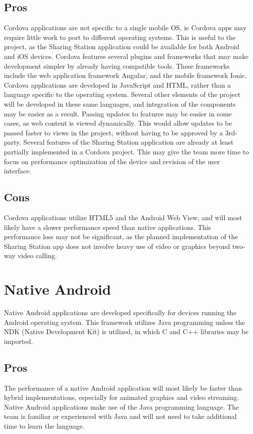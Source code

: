 \documentclass[letterpaper,10pt,draftclsnofoot,onecolumn]{IEEEtran}
\begin{document}
\subsection*{Pros}
Cordova applications are not specific to a single mobile OS, ie Cordova apps may require little work to port to different operating systems. This is useful to the project, as the Sharing Station application could be available for both Android and iOS devices.
Cordova features several plugins and frameworks that may make development simpler by already having compatible tools. These frameworks include the web application framework Angular, and the mobile framework Ionic.
Cordova applications are developed in JavaScript and HTML, rather than a language specific to the operating system. Several other elements of the project will be developed in these same languages, and integration of the components may be easier as a result.
Passing updates to features may be easier in some cases, as web content is viewed dynamically. This would allow updates to be passed faster to views in the project, without having to be approved by a 3rd-party.
Several features of the Sharing Station application are already at least partially implemented in a Cordova project. This may give the team more time to focus on performance optimization of the device and revision of the user interface.
\subsection*{Cons}
Cordova applications utilize HTML5 and the Android Web View, and will most likely have a slower performance speed than native applications. This performance loss may not be significant, as the planned implementation of the Sharing Station app does not involve heavy use of video or graphics beyond two-way video calling.
\section*{Native Android}
Native Android applications are developed specifically for devices running the Android operating system. This framework utilizes Java programming unless the NDK (Native Development Kit) is utilized, in which C and C++ libraries may be imported.
\subsection*{Pros}
The performance of a native Android application will most likely be faster than hybrid implementations, especially for animated graphics and video streaming.
Native Android applications make use of the Java programming language. The team is familiar or experienced with Java and will not need to take additional time to learn the language.
\end{document}
